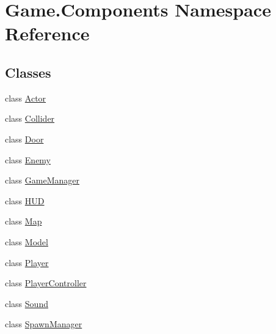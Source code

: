 \hypertarget{namespace_game_1_1_components}{}\section{Game.\+Components Namespace Reference}
\label{namespace_game_1_1_components}
\subsection*{Classes}
\begin{DoxyCompactItemize}
\item 
class \mbox{\hyperlink{class_game_1_1_components_1_1_actor}{Actor}}
\item 
class \mbox{\hyperlink{class_game_1_1_components_1_1_collider}{Collider}}
\item 
class \mbox{\hyperlink{class_game_1_1_components_1_1_door}{Door}}
\item 
class \mbox{\hyperlink{class_game_1_1_components_1_1_enemy}{Enemy}}
\item 
class \mbox{\hyperlink{class_game_1_1_components_1_1_game_manager}{Game\+Manager}}
\item 
class \mbox{\hyperlink{class_game_1_1_components_1_1_h_u_d}{H\+UD}}
\item 
class \mbox{\hyperlink{class_game_1_1_components_1_1_map}{Map}}
\item 
class \mbox{\hyperlink{class_game_1_1_components_1_1_model}{Model}}
\item 
class \mbox{\hyperlink{class_game_1_1_components_1_1_player}{Player}}
\item 
class \mbox{\hyperlink{class_game_1_1_components_1_1_player_controller}{Player\+Controller}}
\item 
class \mbox{\hyperlink{class_game_1_1_components_1_1_sound}{Sound}}
\item 
class \mbox{\hyperlink{class_game_1_1_components_1_1_spawn_manager}{Spawn\+Manager}}
\end{DoxyCompactItemize}
